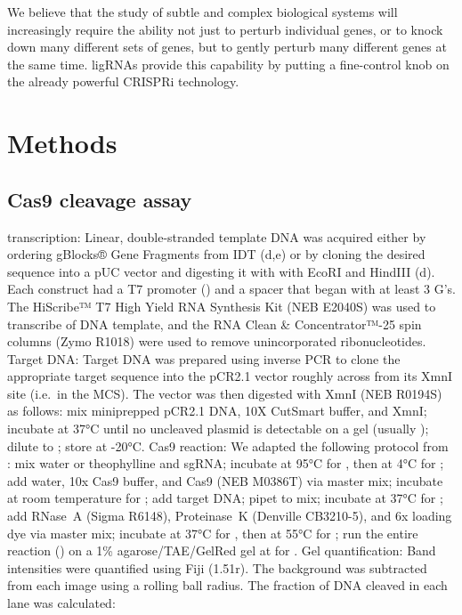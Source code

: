 \documentclass[10pt,oneside]{article}
\begin{document}
We believe that the study of subtle and complex biological systems will increasingly require the ability not just to perturb individual genes, or to knock down many different sets of genes, but to gently perturb many different genes at the same time.  ligRNAs provide this capability by putting a fine-control knob on the already powerful CRISPRi technology.

\section{Methods}

\subsection{\Invitro{} Cas9 cleavage assay}

\Invitro{} transcription: Linear, double-stranded template DNA was acquired either by ordering gBlocks® Gene Fragments from IDT (d,e) or by cloning the desired sequence into a pUC vector and digesting it with with EcoRI and HindIII (d).  Each construct had a T7 promoter () and a spacer that began with at least 3 G's.  The HiScribe™ T7 High Yield RNA Synthesis Kit (NEB E2040S) was used to transcribe  of DNA template, and the RNA Clean \& Con\-cen\-trator™-25 spin columns (Zymo R1018) were used to remove unincorporated ribonucleotides.  Target DNA: Target DNA was prepared using inverse PCR to clone the appropriate target sequence into the pCR2.1 vector roughly across from its XmnI site (i.e.\ in the MCS).  The vector was then digested with XmnI (NEB R0194S) as follows: mix   miniprepped pCR2.1 DNA,  10X CutSmart buffer, and   XmnI; incubate at 37°C until no uncleaved plasmid is detectable on a gel (usually ); dilute to ; store at -20°C.  Cas9 reaction: We adapted the following protocol from : mix  water or  theophylline and   sgRNA; incubate at 95°C for , then at 4°C for ; add  water,  10x Cas9 buffer, and   Cas9 (NEB M0386T) via master mix; incubate at room temperature for ; add   target DNA; pipet to mix; incubate at 37°C for ; add   RNase~A (Sigma R6148),   Proteinase~K (Denville CB3210-5), and  6x loading dye via master mix; incubate at 37°C for , then at 55°C for ; run the entire reaction () on a 1\% agarose/TAE/GelRed gel at  for .  Gel quantification: Band intensities were quantified using Fiji (1.51r).  The background was subtracted from each image using a  rolling ball radius.  The fraction of DNA cleaved in each lane was calculated:
\end{document}
